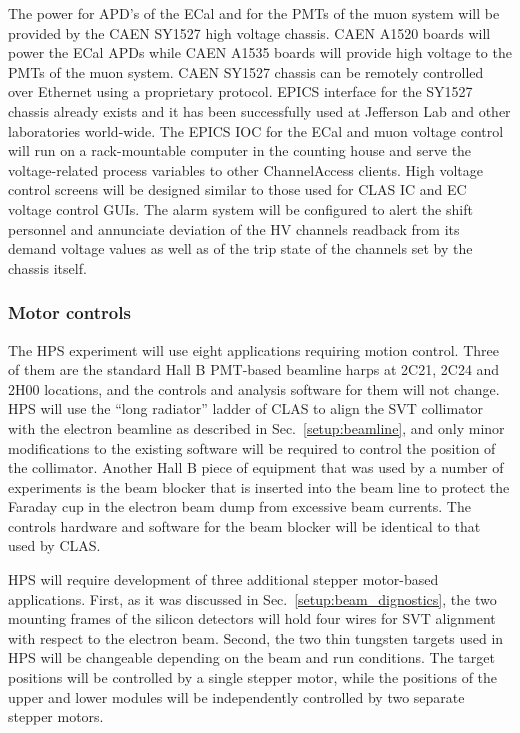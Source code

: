 The power for APD's of the ECal and for the PMTs of the muon system  will be provided by the   
CAEN SY1527 high voltage chassis. CAEN A1520 boards will power the ECal APDs while CAEN A1535 boards will 
provide high voltage to the PMTs of the muon system. CAEN SY1527 chassis can be remotely controlled over Ethernet 
using a proprietary protocol. EPICS interface for the SY1527 chassis already exists and it has been successfully 
used at Jefferson Lab and other laboratories world-wide. The EPICS IOC for the ECal and muon voltage 
control will run on a rack-mountable computer in the counting house and serve the voltage-related process 
variables to other ChannelAccess clients. High voltage control screens will be designed 
similar to those used for CLAS IC and EC voltage control GUIs. The alarm system will be configured to alert 
the shift personnel and annunciate deviation of the HV channels readback from its demand voltage values as  
well as of the trip state of the channels set by the chassis itself.    


\subsubsection{Motor controls}
\label{sec:ctrls:motor}
The HPS experiment will use eight applications requiring motion control. Three of them 
are the standard Hall B PMT-based beamline harps at 2C21, 2C24 and 2H00 locations,  and the controls 
and analysis software for them will not change.  HPS will use the ``long radiator'' ladder of CLAS to align  
the SVT collimator with the electron beamline as described in Sec.~\ref{setup:beamline}, and only minor 
modifications to the existing software will be required to control the position of the collimator.
Another Hall B piece of equipment that was used by a number of experiments is the beam blocker that is inserted 
into the beam line to protect the Faraday cup in the electron beam dump from excessive beam currents. The 
controls hardware and software for the beam blocker will be identical to that used by CLAS. 

HPS will require development of three additional stepper motor-based applications. 
First, as it was discussed in Sec.~\ref{setup:beam_dignostics}, the two mounting frames of the silicon detectors 
will hold four wires for SVT alignment with respect to the electron beam. Second, the two thin 
tungsten targets used in HPS will be changeable depending on the beam and run conditions. The target 
positions will be controlled by a single stepper motor, while the positions of the upper and lower 
modules will be independently controlled by two separate stepper motors. 

